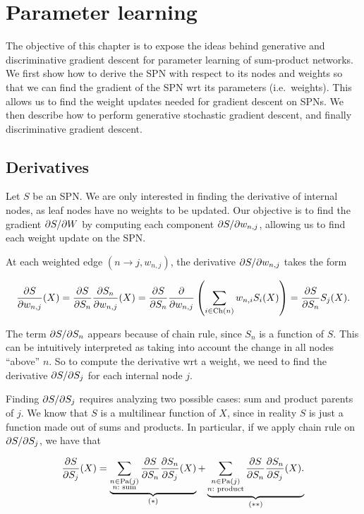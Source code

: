 \chapter{Parameter learning}\label{chp:weights}

The objective of this chapter is to expose the ideas behind generative and discriminative gradient
descent for parameter learning of sum-product networks. We first show how to derive the SPN with
respect to its nodes and weights so that we can find the gradient of the SPN wrt its parameters
(i.e.\ weights). This allows us to find the weight updates needed for gradient descent on SPNs. We
then describe how to perform generative stochastic gradient descent, and finally discriminative
gradient descent.

\section{Derivatives}

Let $S$ be an SPN\@. We are only interested in finding the derivative of internal nodes, as leaf
nodes have no weights to be updated. Our objective is to find the gradient $\partial S/\partial W$ by
computing each component $\partial S/\partial w_{n,j}$, allowing us to find each weight update on the
SPN\@.

At each weighted edge $(n\to j, w_{n,j})$, the derivative $\partial S/\partial w_{n,j}$ takes the form

\begin{equation}
  \frac{\partial S}{\partial w_{n,j}}(X)=\frac{\partial S}{\partial S_n}\frac{\partial S_n}{\partial w_{n,j}}(X)=
    \frac{\partial S}{\partial S_n}\frac{\partial}{\partial w_{n,j}}\left(\sum_{i\in\operatorname*{\text{Ch}}(n)}w_{n,i}S_i(X)\right)=
    \frac{\partial S}{\partial S_n}S_j(X).
\end{equation}

The term $\partial S/\partial S_n$ appears because of chain rule, since $S_n$ is a function of $S$. This
can be intuitively interpreted as taking into account the change in all nodes ``above'' $n$. So to
compute the derivative wrt a weight, we need to find the derivative $\partial S/\partial S_j$ for each
internal node $j$.

Finding $\partial S/\partial S_j$ requires analyzing two possible cases: sum and product parents of $j$.
We know that $S$ is a multilinear function of $X$, since in reality $S$ is just a function made out
of sums and products. In particular, if we apply chain rule on $\partial S/\partial S_j$, we have that

\begin{equation*}
  \frac{\partial S}{\partial S_j}(X)=\underbrace{\sum_{\substack{n\in\operatorname*{\text{Pa}}(j)\\n:\text{
          sum}}}\frac{\partial S}{\partial S_n}\frac{\partial S_n}{\partial S_j}(X)}_{(\ast)}+
    \underbrace{\sum_{\substack{n\in\operatorname*{\text{Pa}}(j)\\n:\text{
            product}}}\frac{\partial S}{\partial S_n}\frac{\partial S_n}{\partial S_j}(X).}_{(\ast\ast)}
\end{equation*}

